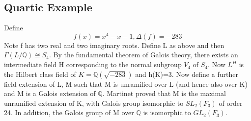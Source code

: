 \documentclass[preprint,12pt,reqno]{elsarticle}
\begin{document}
\subsection{Quartic Example}
Define  \begin{equation}
    f(x)=x^4-x-1, \Delta(f)=-283
\end{equation}
Note f has two real and two imaginary roots. Define L as above and then $\Gamma(L/\mathbb{Q})\cong S_4$. By the fundamental theorem of Galois theory, there exists an intermediate field H corresponding to the normal subgroup $V_4$ of $S_4$. Now $L^H$ is the Hilbert class field of $K= \mathbb{Q}(\sqrt{-283})$ and h(K)=3. Now define a further field extension of L, M such that M is unramified over L (and hence also over K) and M is a Galois extension of $\mathbb{Q}$. Martinet proved that M is the maximal unramified extension of K, with Galois group isomorphic to $SL_2(F_3)$ of order 24. In addition, the Galois group of M over $\mathbb{Q}$ is isomorphic to $GL_2(F_3)$. 
\begin{center}
\end{center}
\end{document}
